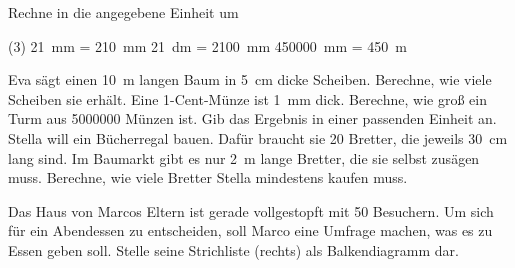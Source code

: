 \documentclass[
	full-,
	a5paper,
	Probe,
	]{KA} %
\begin{document}
\begin{Loesung} %
	Rechne in die angegebene Einheit um
	\begin{tasks}(3)
		\task \SI{21}{\milli\meter} = \SI{210}{\milli\meter}
		\task \SI{21}{\deci\meter} = \SI{2100}{\milli\meter}
		\task \SI{450000}{\milli\meter} = \SI{450}{\meter}
	\end{tasks}
\end{Loesung}
\begin{Aufgabe*}{0} %
\begin{tasks}
	\task Eva sägt einen \SI{10}{\meter} langen Baum in \SI{5}{\centi\meter} dicke Scheiben. Berechne, wie viele
	Scheiben sie erhält.
	\task Eine 1-Cent-Münze ist \SI{1}{\milli\meter} dick.
	Berechne, wie groß ein Turm aus \num{5000000} Münzen ist. Gib
	das Ergebnis in einer passenden Einheit an.
	\task Stella will ein Bücherregal bauen. Dafür braucht sie 20 Bretter, die jeweils \SI{30}{\centi\meter} lang sind.
	Im Baumarkt gibt es nur \SI{2}{\meter} lange Bretter, die sie selbst zusägen muss. Berechne, wie viele Bretter Stella mindestens kaufen muss.
\end{tasks}
\end{Aufgabe*}
\begin{Aufgabe}{0} %

	\begin{minipage}{0.55\textwidth}
	Das Haus von Marcos Eltern ist gerade vollgestopft mit 50 Besuchern.
	Um sich für ein Abendessen zu entscheiden, soll Marco eine Umfrage machen, was es zu Essen geben soll. Stelle seine
	Strichliste (rechts) als Balkendiagramm dar.
	\end{minipage}
	\hfill
	\begin{minipage}{0.4\textwidth}
	\end{minipage}
\end{Aufgabe}
\end{document}
